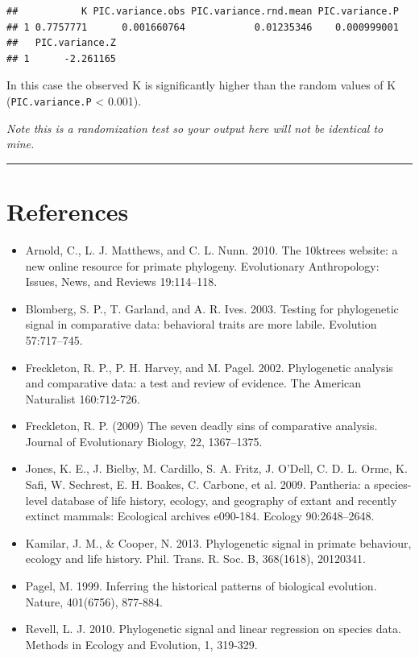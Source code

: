 \documentclass[]{book}
\providecommand{\tightlist}{%
  \setlength{\itemsep}{0pt}\setlength{\parskip}{0pt}}
\begin{document}
\begin{verbatim}
##           K PIC.variance.obs PIC.variance.rnd.mean PIC.variance.P
## 1 0.7757771      0.001660764            0.01235346    0.000999001
##   PIC.variance.Z
## 1      -2.261165
\end{verbatim}

In this case the observed K is significantly higher than the random
values of K (\texttt{PIC.variance.P} \textless{} 0.001).

\emph{Note this is a randomization test so your output here will not be
identical to mine.}

\begin{center}\rule{0.5\linewidth}{\linethickness}\end{center}

\section{References}\label{references-1}

\begin{itemize}
\tightlist
\item
  Arnold, C., L. J. Matthews, and C. L. Nunn. 2010. The 10ktrees
  website: a new online resource for primate phylogeny. Evolutionary
  Anthropology: Issues, News, and Reviews 19:114--118.
\item
  Blomberg, S. P., T. Garland, and A. R. Ives. 2003. Testing for
  phylogenetic signal in comparative data: behavioral traits are more
  labile. Evolution 57:717--745.
\item
  Freckleton, R. P., P. H. Harvey, and M. Pagel. 2002. Phylogenetic
  analysis and comparative data: a test and review of evidence. The
  American Naturalist 160:712-726.
\item
  Freckleton, R. P. (2009) The seven deadly sins of comparative
  analysis. Journal of Evolutionary Biology, 22, 1367--1375.
\item
  Jones, K. E., J. Bielby, M. Cardillo, S. A. Fritz, J. O'Dell, C. D. L.
  Orme, K. Safi, W. Sechrest, E. H. Boakes, C. Carbone, et al. 2009.
  Pantheria: a species-level database of life history, ecology, and
  geography of extant and recently extinct mammals: Ecological archives
  e090-184. Ecology 90:2648--2648.
\item
  Kamilar, J. M., \& Cooper, N. 2013. Phylogenetic signal in primate
  behaviour, ecology and life history. Phil. Trans. R. Soc. B,
  368(1618), 20120341.
\item
  Pagel, M. 1999. Inferring the historical patterns of biological
  evolution. Nature, 401(6756), 877-884.
\item
  Revell, L. J. 2010. Phylogenetic signal and linear regression on
  species data. Methods in Ecology and Evolution, 1, 319-329.
\end{itemize}
\end{document}
